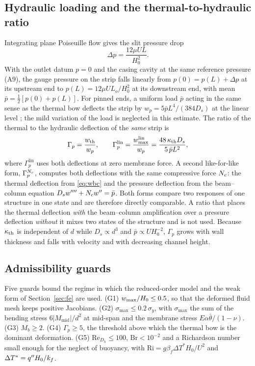 \subsection{Hydraulic loading and the thermal-to-hydraulic ratio}
\label{sec:hydraulic}
Integrating plane Poiseuille flow \citep{bird1960transport,shah1978laminar} gives the slit pressure
drop
\begin{equation}
\Delta p=\frac{12\mu UL}{H_0^2}. \label{eq:dp}
\end{equation}
With the outlet datum $p=0$ and the casing cavity at the same reference pressure (A9), the gauge
pressure on the strip falls linearly from $p(0)=p(L)+\Delta p$ at its upstream end to
$p(L)=12\mu UL_o/H_0^2$ at its downstream end, with mean $\bar p=\tfrac12[p(0)+p(L)]$. For pinned ends, a uniform load
$\bar p$ acting in the same sense as the thermal bow deflects the strip by
$w_p=5\bar pL^4/(384D_s)$ at the linear level \citep{timoshenko1970elasticity}; the mild variation of
the load is neglected in this estimate. The ratio of the thermal to the hydraulic deflection of the
\emph{same} strip is
\begin{equation}
\Gamma_p=\frac{w_{\mathrm{th}}}{w_p},\qquad
\Gamma_p^{\mathrm{lin}}=\frac{w_{\max}^{\mathrm{lin}}}{w_p}=\frac{48\,\kappa_{\mathrm{th}} D_s}{5\,\bar pL^2}, \label{eq:gammap}
\end{equation}
where $\Gamma_p^{\mathrm{lin}}$ uses both deflections at zero membrane force. A second like-for-like
form, $\Gamma_p^{N_c}$, computes both deflections with the same compressive force $N_c$: the thermal
deflection from \eqref{eq:wbc} and the pressure deflection from the beam--column equation
$D_sw^{\prime\prime\prime\prime}+N_c w^{\prime\prime}=\bar p$. Both forms compare two responses of one
structure in one state and are therefore directly comparable. A ratio that places the thermal
deflection \emph{with} the beam--column amplification over a pressure deflection \emph{without} it
mixes two states of the structure and is not used. Because $\kappa_{\mathrm{th}}$ is independent of $d$ while
$D_s\propto d^3$ and $\bar p\propto UH_0^{-2}$, $\Gamma_p$ grows with wall thickness and falls with
velocity and with decreasing channel height.

\subsection{Admissibility guards}
\label{sec:guards}
Five guards bound the regime in which the reduced-order model and the weak form of
Section~\ref{sec:fe} are used. (G1) $w_{\max}/H_0\le0.5$, so that the deformed fluid mesh keeps positive
Jacobians. (G2) $\sigma_{\max}\le0.2\,\sigma_y$, with $\sigma_{\max}$ the sum of the bending stress
$6|M_{\mathrm{mid}}|/d^2$ at mid-span and the membrane stress $E\alpha\bar\theta/(1-\nu)$.
(G3) $M_b\ge2$. (G4) $\Gamma_p\ge5$, the threshold above which the thermal bow is the dominant
deformation. (G5) $\mathrm{Re}_{D_h}\le100$, $\mathrm{Br}<10^{-2}$ and a Richardson number small enough
for the neglect of buoyancy, with $\mathrm{Ri}=g\beta_f\Delta T^{*}H_0/U^2$ and $\Delta T^{*}=q^{\prime\prime} H_0/k_f$.
